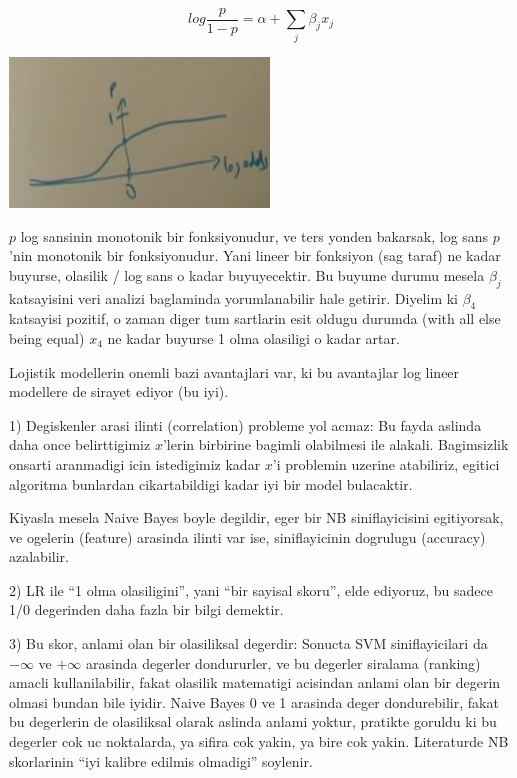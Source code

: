 \documentclass[12pt,fleqn]{article}\usepackage{../common}
\begin{document}
$$ log \frac{p}{1-p} = \alpha + \sum_j \beta_j x_j $$

\includegraphics[height=4cm]{crf_2.png}

$p$ log sansinin monotonik bir fonksiyonudur, ve ters yonden bakarsak, log
sans $p$'nin monotonik bir fonksiyonudur. Yani lineer bir fonksiyon (sag
taraf) ne kadar buyurse, olasilik / log sans o kadar buyuyecektir. Bu
buyume durumu mesela $\beta_j$ katsayisini veri analizi baglaminda
yorumlanabilir hale getirir. Diyelim ki $\beta_4$ katsayisi pozitif, o
zaman diger tum sartlarin esit oldugu durumda (with all else being equal)
$x_4$ ne kadar buyurse 1 olma olasiligi o kadar artar.

Lojistik modellerin onemli bazi avantajlari var, ki bu avantajlar log
lineer modellere de sirayet ediyor (bu iyi). 

1) Degiskenler arasi ilinti (correlation) probleme yol acmaz: Bu fayda
aslinda daha once belirttigimiz $x$'lerin birbirine bagimli olabilmesi ile
alakali. Bagimsizlik onsarti aranmadigi icin istedigimiz kadar $x$'i
problemin uzerine atabiliriz, egitici algoritma bunlardan cikartabildigi
kadar iyi bir model bulacaktir.

Kiyasla mesela Naive Bayes boyle degildir, eger bir NB siniflayicisini
egitiyorsak, ve ogelerin (feature) arasinda ilinti var ise, siniflayicinin
dogrulugu (accuracy) azalabilir.

2) LR ile ``1 olma olasiligini'', yani ``bir sayisal skoru'', elde
ediyoruz, bu sadece 1/0 degerinden daha fazla bir bilgi demektir.

3) Bu skor, anlami olan bir olasiliksal degerdir: Sonucta SVM
siniflayicilari da $-\infty$ ve $+\infty$ arasinda degerler dondururler, ve
bu degerler siralama (ranking) amacli kullanilabilir, fakat olasilik
matematigi acisindan anlami olan bir degerin olmasi bundan bile
iyidir. Naive Bayes 0 ve 1 arasinda deger dondurebilir, fakat bu degerlerin
de olasiliksal olarak aslinda anlami yoktur, pratikte goruldu ki bu
degerler cok uc noktalarda, ya sifira cok yakin, ya bire cok
yakin. Literaturde NB skorlarinin ``iyi kalibre edilmis olmadigi''
soylenir.
\end{document}
